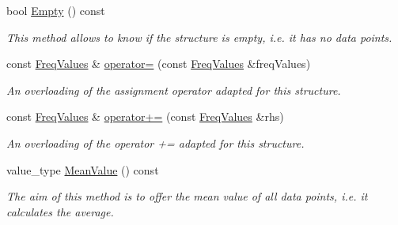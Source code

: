 \begin{DoxyCompactItemize}
\mbox{\label{structFreqValues_ae5a9b788cbf75ad4c3e1dd1ed86a0ddc}} 
bool \hyperlink{structFreqValues_ae5a9b788cbf75ad4c3e1dd1ed86a0ddc}{Empty} () const
\begin{DoxyCompactList}\small\item\em This method allows to know if the structure is empty, i.\+e. it has no data points. \end{DoxyCompactList}\item 
const \hyperlink{structFreqValues}{Freq\+Values} \& \hyperlink{structFreqValues_a11021e293ec300860ffc503d3c37a58c}{operator=} (const \hyperlink{structFreqValues}{Freq\+Values} \&freq\+Values)
\begin{DoxyCompactList}\small\item\em An overloading of the assignment operator adapted for this structure. \end{DoxyCompactList}\item 
const \hyperlink{structFreqValues}{Freq\+Values} \& \hyperlink{structFreqValues_a8024942907aaf5fd4aaa49850bbe6cd5}{operator+=} (const \hyperlink{structFreqValues}{Freq\+Values} \&rhs)
\begin{DoxyCompactList}\small\item\em An overloading of the operator += adapted for this structure. \end{DoxyCompactList}\item 
\mbox{\label{structFreqValues_ae1e93224906ea823dd3e930a447c8bd9}} 
value\+\_\+type \hyperlink{structFreqValues_ae1e93224906ea823dd3e930a447c8bd9}{Mean\+Value} () const
\begin{DoxyCompactList}\small\item\em The aim of this method is to offer the mean value of all data points, i.\+e. it calculates the average. \end{DoxyCompactList}\end{DoxyCompactItemize}
